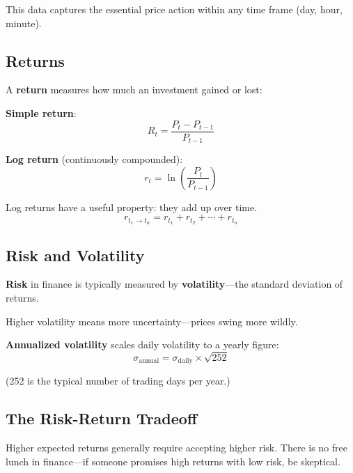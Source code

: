 This data captures the essential price action within any time frame (day,
hour, minute).

\subsection{Returns}


A \textbf{return} measures how much an investment gained or lost:

\textbf{Simple return}:
\[
R_t = \frac{P_t - P_{t-1}}{P_{t-1}}
\]

\textbf{Log return} (continuously compounded):
\[
r_t = \ln\left(\frac{P_t}{P_{t-1}}\right)
\]

Log returns have a useful property: they add up over time.
\[
r_{t_1 \to t_n} = r_{t_1} + r_{t_2} + \cdots + r_{t_n}
\]

\subsection{Risk and Volatility}

\textbf{Risk} in finance is typically measured by \textbf{volatility}---the
standard deviation of returns.


Higher volatility means more uncertainty---prices swing more wildly.

\textbf{Annualized volatility} scales daily volatility to a yearly figure:
\[
\sigma_{\text{annual}} = \sigma_{\text{daily}} \times \sqrt{252}
\]

(252 is the typical number of trading days per year.)

\subsection{The Risk-Return Tradeoff}

\begin{keyinsight}
Higher expected returns generally require accepting higher risk. There is no
free lunch in finance---if someone promises high returns with low risk, be
skeptical.
\end{keyinsight}

